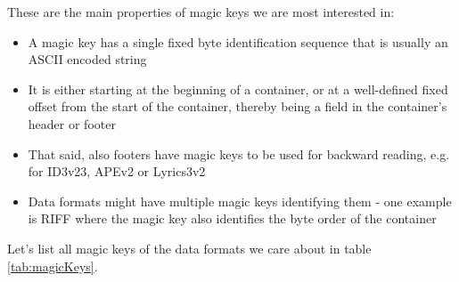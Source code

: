 These are the main properties of magic keys we are most interested in:
\begin{itemize}
\item A magic key has a single fixed byte identification sequence that is usually an ASCII encoded string
\item It is either starting at the beginning of a container, or at a well-defined fixed offset from the start of the container, thereby being a field in the container's header or footer
\item That said, also footers have magic keys to be used for backward reading, e.g. for ID3v23, APEv2 or Lyrics3v2
\item Data formats might have multiple magic keys identifying them - one example is RIFF where the magic key also identifies the byte order of the container
\end{itemize}

Let's list all magic keys of the data formats we care about in table \ref{tab:magicKeys}.

